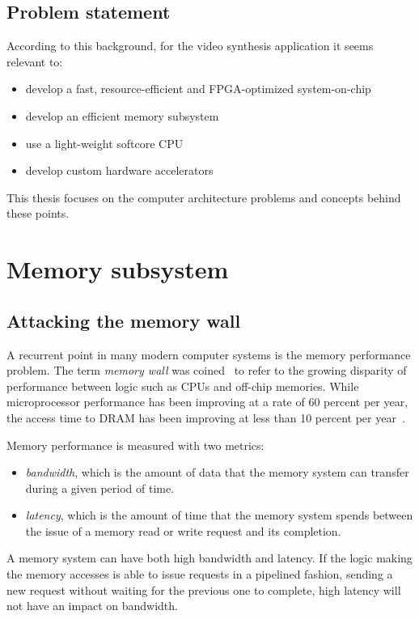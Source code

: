 \documentclass[a4paper,11pt]{kthesis}
\begin{document}
\section{Problem statement}
According to this background, for the video synthesis application it seems relevant to:

\begin{itemize}
\item develop a fast, resource-efficient and FPGA-optimized system-on-chip
\item develop an efficient memory subsystem
\item use a light-weight softcore CPU
\item develop custom hardware accelerators
\end{itemize}

This thesis focuses on the computer architecture problems and concepts behind these points.

\chapter{Memory subsystem}
\section{Attacking the memory wall}
\label{sec:memorywall}
A recurrent point in many modern computer systems is the memory performance problem. The term \textit{memory wall} was coined~\cite{memorywall} to refer to the growing disparity of performance between logic such as CPUs and off-chip memories. While microprocessor performance has been improving at a rate of 60 percent per year, the access time to DRAM has been improving at less than 10 percent per year~\cite{memvscpu}.

Memory performance is measured with two metrics:
\begin{itemize}
\item \textit{bandwidth}, which is the amount of data that the memory system can transfer during a given period of time.
\item \textit{latency}, which is the amount of time that the memory system spends between the issue of a memory read or write request and its completion.
\end{itemize}

A memory system can have both high bandwidth and latency. If the logic making the memory accesses is able to issue requests in a pipelined fashion, sending a new request without waiting for the previous one to complete, high latency will not have an impact on bandwidth.
\end{document}
